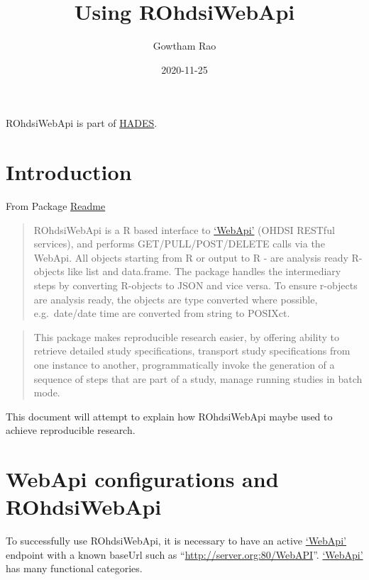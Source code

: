 \documentclass[
]{article}
\title{Using ROhdsiWebApi}
\author{Gowtham Rao}
\date{2020-11-25}
\begin{document}
\maketitle

{
\setcounter{tocdepth}{2}
\tableofcontents
}
ROhdsiWebApi is part of \href{https://ohdsi.github.io/Hades}{HADES}.

\hypertarget{introduction}{%
\section{Introduction}\label{introduction}}

From Package
\href{https://github.com/OHDSI/ROhdsiWebApi/blob/master/README.md}{Readme}

\begin{quote}
ROhdsiWebApi is a R based interface to
\href{https://github.com/ohdsi/webapi}{`WebApi'} (OHDSI RESTful
services), and performs GET/PULL/POST/DELETE calls via the WebApi. All
objects starting from R or output to R - are analysis ready R-objects
like list and data.frame. The package handles the intermediary steps by
converting R-objects to JSON and vice versa. To ensure r-objects are
analysis ready, the objects are type converted where possible,
e.g.~date/date time are converted from string to POSIXct.
\end{quote}

\begin{quote}
This package makes reproducible research easier, by offering ability to
retrieve detailed study specifications, transport study specifications
from one instance to another, programmatically invoke the generation of
a sequence of steps that are part of a study, manage running studies in
batch mode.
\end{quote}

This document will attempt to explain how ROhdsiWebApi maybe used to
achieve reproducible research.

\hypertarget{webapi-configurations-and-rohdsiwebapi}{%
\section{WebApi configurations and
ROhdsiWebApi}\label{webapi-configurations-and-rohdsiwebapi}}

To successfully use ROhdsiWebApi, it is necessary to have an active
\href{https://github.com/ohdsi/webapi}{`WebApi'} endpoint with a known
baseUrl such as ``\url{http://server.org:80/WebAPI}''.
\href{https://github.com/ohdsi/webapi}{`WebApi'} has many functional
categories.
\end{document}
